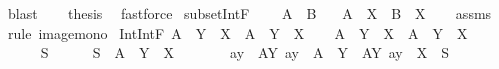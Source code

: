 \begin{isabellebody}
\ blast\isanewline
\ \ \isamarkupfalse%
\ {\isacharquery}{\kern0pt}thesis\ \isamarkupfalse%
\ fastforce\isanewline
{}\isamarkupfalse%
%
\endisatagproof
{\isafoldproof}%
%
\isadelimproof
\isanewline
%
\endisadelimproof
\isanewline
{}\isamarkupfalse%
\ subset{\isacharunderscore}{\kern0pt}IntF{\isacharcolon}{\kern0pt}\ \isanewline
\ \ \ {\isachardoublequoteopen}A\ {\isasymsubseteq}\ B{\isachardoublequoteclose}\isanewline
\ \ \ {\isachardoublequoteopen}A\ {\isasyminter}{\isacharasterisk}{\kern0pt}\ X\ {\isasymsubseteq}\ B\ {\isasyminter}{\isacharasterisk}{\kern0pt}\ X{\isachardoublequoteclose}\isanewline
%
\isadelimproof
\ \ %
\endisadelimproof
%
\isatagproof
{}\isamarkupfalse%
\ assms\ \isamarkupfalse%
\ {\isacharparenleft}{\kern0pt}rule\ image{\isacharunderscore}{\kern0pt}mono{\isacharparenright}{\kern0pt}%
\endisatagproof
{\isafoldproof}%
%
\isadelimproof
\isanewline
%
\endisadelimproof
\isanewline
{}\isamarkupfalse%
\ Int{\isacharunderscore}{\kern0pt}IntF{\isacharcolon}{\kern0pt}\ {\isachardoublequoteopen}{\isacharparenleft}{\kern0pt}A\ {\isasyminter}{\isacharasterisk}{\kern0pt}\ Y{\isacharparenright}{\kern0pt}\ {\isasyminter}{\isacharasterisk}{\kern0pt}\ X\ {\isacharequal}{\kern0pt}\ A\ {\isasyminter}{\isacharasterisk}{\kern0pt}\ {\isacharparenleft}{\kern0pt}Y\ {\isasyminter}\ X{\isacharparenright}{\kern0pt}{\isachardoublequoteclose}\isanewline
%
\isadelimproof
%
\endisadelimproof
%
\isatagproof
{}\isamarkupfalse%
\isanewline
\ \ \isamarkupfalse%
\ {\isachardoublequoteopen}A\ {\isasyminter}{\isacharasterisk}{\kern0pt}\ Y\ {\isasyminter}{\isacharasterisk}{\kern0pt}\ X\ {\isasymsubseteq}\ A\ {\isasyminter}{\isacharasterisk}{\kern0pt}\ {\isacharparenleft}{\kern0pt}Y\ {\isasyminter}\ X{\isacharparenright}{\kern0pt}{\isachardoublequoteclose}\isanewline
\ \ \isamarkupfalse%
\isanewline
\ \ \ \ \isamarkupfalse%
\ S\isanewline
\ \ \ \ \isamarkupfalse%
\ {\isachardoublequoteopen}S\ {\isasymin}\ A\ {\isasyminter}{\isacharasterisk}{\kern0pt}\ Y\ {\isasyminter}{\isacharasterisk}{\kern0pt}\ X{\isachardoublequoteclose}\isanewline
\ \ \ \ \isamarkupfalse%
\ \isamarkupfalse%
\ a{\isacharunderscore}{\kern0pt}y\ \ A{\isacharunderscore}{\kern0pt}Y{}{\isacharcolon}{\kern0pt}\ {\isachardoublequoteopen}a{\isacharunderscore}{\kern0pt}y\ {\isasymin}\ A\ {\isasyminter}{\isacharasterisk}{\kern0pt}\ Y{\isachardoublequoteclose}\ \ A{\isacharunderscore}{\kern0pt}Y{}{\isacharcolon}{\kern0pt}\ {\isachardoublequoteopen}a{\isacharunderscore}{\kern0pt}y\ {\isasyminter}\ X\ {\isacharequal}{\kern0pt}\ S{\isachardoublequoteclose}\ \isamarkupfalse%

\end{isabellebody}
